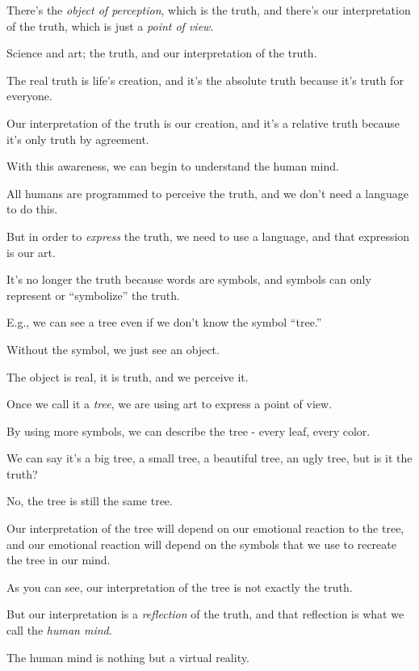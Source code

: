 \documentclass{article}
\numberwithin{equation}{section}
\begin{document}
There's the \textit{object of perception}, which is the truth, and there's our interpretation of the truth, which is just a \textit{point of view}.



Science and art; the truth, and our interpretation of the truth.

The real truth is life's creation, and it's the absolute truth because it's truth for everyone.

Our interpretation of the truth is our creation, and it's a relative truth because it's only truth by agreement.

With this awareness, we can begin to understand the human mind.

%
All humans are programmed to perceive the truth, and we don't need a language to do this.

But in order to \textit{express} the truth, we need to use a language, and that expression is our art.

It's no longer the truth because words are symbols, and symbols can only represent or ``symbolize'' the truth.

E.g., we can see a tree even if we don't know the symbol ``tree.''

Without the symbol, we just see an object.

The object is real, it is truth, and we perceive it.

Once we call it a \textit{tree}, we are using art to express a point of view.

By using more symbols, we can describe the tree - every leaf, every color.

We can say it's a big tree, a small tree, a beautiful tree, an ugly tree, but is it the truth?

No, the tree is still the same tree.

%
Our interpretation of the tree will depend on our emotional reaction to the tree, and our emotional reaction will depend on the symbols that we use to recreate the tree in our mind.

As you can see, our interpretation of the tree is not exactly the truth.

But our interpretation is a \textit{reflection} of the truth, and that reflection is what we call the \textit{human mind}.

The human mind is nothing but a virtual reality.
\end{document}
